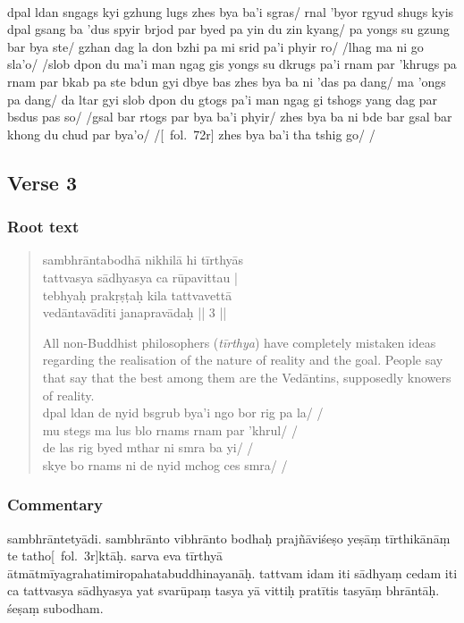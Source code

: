 \documentclass[12pt]{article}
\begin{document}
\textbf{\TVB}\\
dpal ldan sngags kyi gzhung lugs zhes bya ba'i sgras/ rnal 'byor rgyud shugs kyis dpal gsang ba 'dus spyir brjod par byed pa yin du zin kyang/ pa yongs su gzung bar bya ste/ gzhan dag la don bzhi pa mi srid pa'i phyir ro/ /lhag ma ni go sla'o/ /slob dpon du ma'i man ngag gis yongs su dkrugs pa'i rnam par 'khrugs pa rnam par bkab pa ste bdun gyi dbye bas zhes bya ba ni 'das pa dang/ ma 'ongs pa dang/ da ltar gyi slob dpon du gtogs pa'i man ngag gi tshogs yang dag par bsdus pas so/ /gsal bar rtogs par bya ba'i phyir/ zhes bya ba ni bde bar gsal bar khong du chud par bya'o/ /[\TVB\ fol.\ 72r] zhes bya ba'i tha tshig go/ /

\subsection{Verse 3}
\subsubsection{Root text}
\begin{quote}
	sambhrāntabodhā nikhilā hi tīrthyās \\%
	tattvasya sādhyasya ca rūpavittau |\\
	tebhyaḥ prakṛṣṭaḥ kila tattvavettā\\
	vedāntavādīti janapravādaḥ || 3 ||

	All non-Buddhist philosophers (\emph{tīrthya}) have completely mistaken ideas regarding the realisation of the nature of reality and the goal.
	People say that say that the best among them are the Vedāntins, supposedly knowers of reality.\\

	dpal ldan de nyid bsgrub bya'i ngo bor rig pa la/ /\\
	mu stegs ma lus blo rnams rnam par 'khrul/ /\\
	de las rig byed mthar ni smra ba yi/ /\\
	skye bo rnams ni de nyid mchog ces smra/ /
\end{quote}

\subsubsection{Commentary}
sambhrāntetyādi.
sambhrānto vibhrānto bodhaḥ prajñāviśeṣo yeṣāṃ tīrthikānāṃ te tatho[\MS\ fol.\ 3r]ktāḥ.\footnoteB{
	te tathoktāḥ]; \MS\PCreading ; te thoktāḥ \MS\ACreading ; tathoktāḥ \EDD
}
sarva eva tīrthyā ātmātmīyagrahatimiropahatabuddhinayanāḥ.
tattvam idam iti sādhyaṃ cedam iti ca tattvasya sādhyasya yat\footnoteB{
	yat] \EDD\ (\emd); tat \MS
} svarūpaṃ tasya yā vittiḥ pratītis tasyāṃ bhrāntāḥ.
śeṣaṃ subodham.\\
\end{document}
